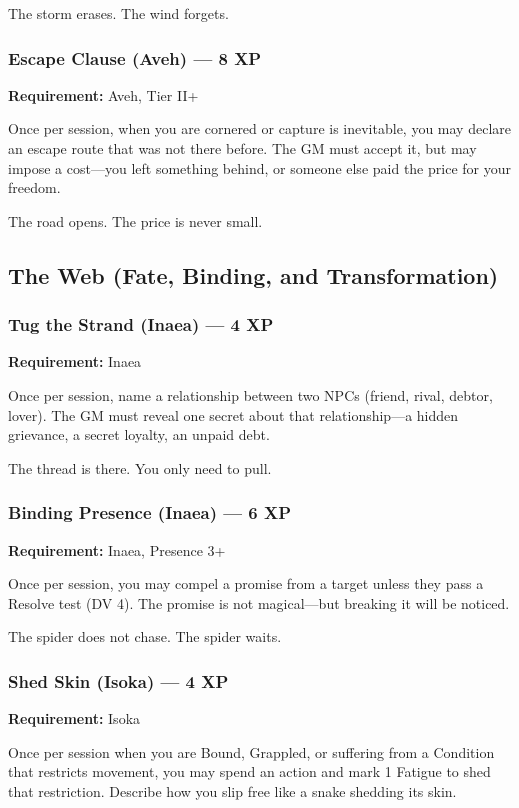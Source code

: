 The storm erases. The wind forgets.

\subsubsection{Escape Clause (Aveh) — 8 XP}

\textbf{Requirement:} Aveh, Tier II+

Once per session, when you are cornered or capture is inevitable, you may declare an escape route that was not there before. The GM must accept it, but may impose a cost—you left something behind, or someone else paid the price for your freedom.

The road opens. The price is never small.

\subsection{The Web (Fate, Binding, and Transformation)}

\subsubsection{Tug the Strand (Inaea) — 4 XP}

\textbf{Requirement:} Inaea

Once per session, name a relationship between two NPCs (friend, rival, debtor, lover). The GM must reveal one secret about that relationship—a hidden grievance, a secret loyalty, an unpaid debt.

The thread is there. You only need to pull.

\subsubsection{Binding Presence (Inaea) — 6 XP}

\textbf{Requirement:} Inaea, Presence 3+

Once per session, you may compel a promise from a target unless they pass a Resolve test (DV 4). The promise is not magical—but breaking it will be noticed.

The spider does not chase. The spider waits.

\subsubsection{Shed Skin (Isoka) — 4 XP}

\textbf{Requirement:} Isoka

Once per session when you are Bound, Grappled, or suffering from a Condition that restricts movement, you may spend an action and mark 1 Fatigue to shed that restriction. Describe how you slip free like a snake shedding its skin.

